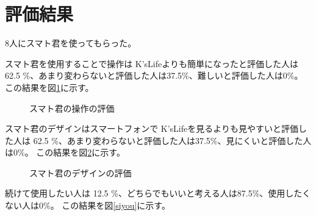 \documentclass[a4j,12pt,onecolumn,oneside,titlepage,openany,final]{jreport}
\begin{document}
\section{評価結果}\label{rihabiri_jisso}
8人にスマト君を使ってもらった。

スマト君を使用することで操作は K'sLifeよりも簡単になったと評価した人は  62.5 \%、あまり変わらないと評価した人は37.5\%、難しいと評価した人は0\%。
この結果を図\ref{sosa}に示す。


\begin{figure}[htbp]
  \centering %
  \caption{スマト君の操作の評価}\label{sosa}
\end{figure}

 スマト君のデザインはスマートフォンで K'sLifeを見るよりも見やすいと評価した人は 62.5 \%、あまり変わらないと評価した人は37.5\%、見にくいと評価した人は0\%。
  この結果を図\ref{dezai}に示す。


 \begin{figure}[htbp]
   \centering %
   \caption{スマト君のデザインの評価}\label{dezai}
 \end{figure}

続けて使用したい人は 12.5 \%、どちらでもいいと考える人は87.5\%、使用したくない人は0\%。
この結果を図\ref{siyou}に示す。
\end{document}

